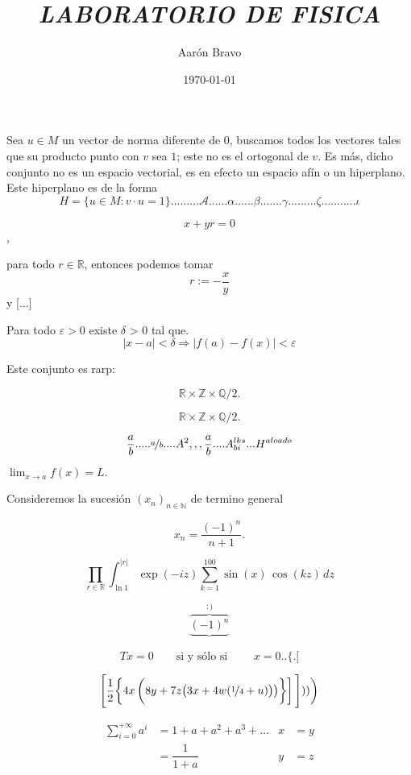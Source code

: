 \documentclass[a4paper,20pt]{article}
\author{Aarón Bravo}
\title{\textsl{LABORATORIO DE FISICA}}
\date{\today}
\begin{document}
	\maketitle
	\begin{multicols}{2}

Sea \(u\in M\) un vector de norma diferente de \(0\), buscamos todos los vectores tales que su producto punto con \(v\) sea \(1\); este no es el ortogonal de \(v\). Es más, dicho conjunto no es un espacio vectorial, es en efecto un espacio afín o un hiperplano. Este hiperplano es de la forma
\[
	H=\{u\in M  : v \cdot u=1\}. . . . . . . . .	\mathscr{A}......\alpha......\beta.......\gamma.........\zeta...........\iota
\]
	\end{multicols}
	
\[
	x+yr=0
\],

para todo \(r\in\mathbb{R}\), entonces podemos tomar
\[
	r:=-\dfrac{x}{y}
\]
y [...]

Para todo \( \varepsilon > 0\) existe \(\delta\) > \(0\) tal que.
\[
	|x-a|<\delta \Rightarrow |f(a)-f(x)|< \varepsilon
\]

Este conjunto es rarp:

\[
 \mathbb{R} \times \mathbb{Z} \times \mathbb{Q} / 2.
\]

\begin{equation}
	 \mathbb{R} \times \mathbb{Z} \times \mathbb{Q} / 2.
\end{equation}

\begin{equation}
\dfrac{a}{b} .....\nicefrac{a}{b}....A^2,,,\frac{a}{b}....A_{bi}^{lks}...H^{aloado}
\end{equation}



\( \displaystyle \lim_{x \to a} f(x) = L. \)

Consideremos la sucesión \((x_n)_{n \in \mathbb{N}} \) de termino general

\[
	x_n= \dfrac{(-1)^n}{n+1} .
\]

\[
	\prod_{r \in \mathbb{R}} \int_{\ln 1}^{|r|} \exp (-iz) \sum_{k=1}^{100} \sin (x)\, \cos (kz)\, dz
\]

\[
	\overbrace{\underbrace{(-1)^n}_{}}^{:)}
\]

\[
	Tx=0 \qquad \text{si y sólo si }\qquad x=0..\big\{.\Big[
\]

\[
	\Bigg[ \dfrac{1}{2} \bigg\{4x \left( 8y + 7z \big ( 3x + 4w ( \nicefrac{1}{4} + u)\big ) \big ) \bigg \} \right] \Bigg ] )) \bigg )
\]

\begin{align}

	\sum_{i=0}^{+ \infty} a^i  & = 1 + a + a^2 + a^3 + \ldots &x & = y
	
	\\
		&= \dfrac{1}{1+a} & y & =z 
		
\end{align}
\end{document}
